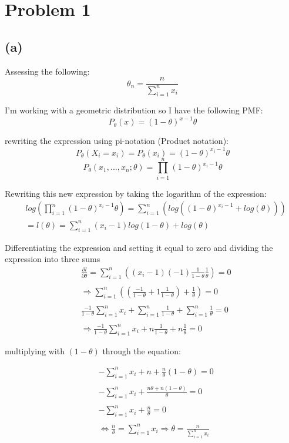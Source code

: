 \section{Problem 1}
\subsection{(a)}
Assessing the following:
$$\theta_n = \frac{n}{\sum_{i=1}^{n} x_i}$$

I'm working with a geometric distribution so I have the following PMF:
$$ P_\theta(x) = (1 - \theta)^{x-1} \theta $$

rewriting the expression using pi-notation (Product notation):
$$ P_\theta (X_i = x_i) = P_\theta(x_i) = (1 - \theta)^{x_i - 1} \theta $$
$$ P_\theta (x_1, ..., x_n ; \theta) = \prod_{i=1}^{n} (1 - \theta)^{x_i - 1} \theta $$

Rewriting this new expression by taking the logarithm of the expression:
\begin{align*}
    & log(\prod_{i=1}^{n} (1 - \theta)^{x_i - 1} \theta) = \sum_{i = 1}^{n} (log ( (1 - \theta)^{x_i - 1} + log(\theta) )) \\
    & = l(\theta) = \sum_{i = 1}^{n} (x_i - 1) log(1 - \theta) + log(\theta)
\end{align*}

Differentiating the expression and setting it equal to zero and dividing the expression into three sums
\begin{align*}
    & \frac{\partial l}{\partial \theta} = \sum_{i = 1}^{n} ( (x_i - 1) (-1) \frac{1}{1 - \theta} \frac{1}{\theta} ) = 0 \\
    & \\
    & \Longrightarrow \sum_{i = 1}^{n} ( (\frac{-1}{1 - \theta} + 1 \frac{1}{1 - \theta}) + \frac{1}{\theta}) = 0 \\
    & \\
    & \frac{-1}{1 - \theta} \sum_{i = 1}^{n} x_i + \sum_{i = 1}^{n} \frac{1}{1 - \theta} + \sum_{i = 1}^{n} \frac{1}{\theta} = 0 \\
    & \\
    & \Longrightarrow \frac{-1}{1 - \theta} \sum_{i = 1}^{n} x_i + n \frac{1}{1 - \theta} + n \frac{1}{\theta} = 0
\end{align*}

multiplying with $ (1 - \theta) $ through the equation:

\begin{align*}
    & - \sum_{i = 1}^{n} x_i + n + \frac{n}{\theta}(1 - \theta) = 0 \\
    & \\
    & - \sum_{i = 1}^{n} x_i + \frac{n \theta + n(1 - \theta)}{\theta} = 0 \\
    & \\
    & - \sum_{i = 1}^{n} x_i + \frac{n}{\theta} = 0 \\
    & \\
    & \Longleftrightarrow \frac{n}{\theta} = \sum_{i = 1}^{n} x_i \Longrightarrow \theta = \frac{n}{\sum_{i = 1}^{n} x_i}
\end{align*}

